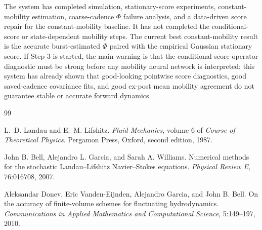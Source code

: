 \documentclass[11pt]{article}
\begin{document}
The system has completed simulation, stationary-score experiments, constant-mobility estimation, coarse-cadence \(\Phi\) failure analysis, and a data-driven score repair for the constant-mobility baseline.  It has not completed the conditional-score or state-dependent mobility steps.  The current best constant-mobility result is the accurate burst-estimated \(\Phi\) paired with the empirical Gaussian stationary score.  If Step 3 is started, the main warning is that the conditional-score operator diagnostic must be strong before any mobility neural network is interpreted: this system has already shown that good-looking pointwise score diagnostics, good saved-cadence covariance fits, and good ex-post mean mobility agreement do not guarantee stable or accurate forward dynamics.

\begin{thebibliography}{99}

L.~D. Landau and E.~M. Lifshitz.
\newblock \emph{Fluid Mechanics}, volume 6 of \emph{Course of Theoretical Physics}.
\newblock Pergamon Press, Oxford, second edition, 1987.

John B. Bell, Alejandro L. Garcia, and Sarah A. Williams.
\newblock Numerical methods for the stochastic Landau--Lifshitz Navier--Stokes equations.
\newblock \emph{Physical Review E}, 76:016708, 2007.

Aleksandar Donev, Eric Vanden-Eijnden, Alejandro Garcia, and John B. Bell.
\newblock On the accuracy of finite-volume schemes for fluctuating hydrodynamics.
\newblock \emph{Communications in Applied Mathematics and Computational Science}, 5:149--197, 2010.

\end{thebibliography}
\end{document}
